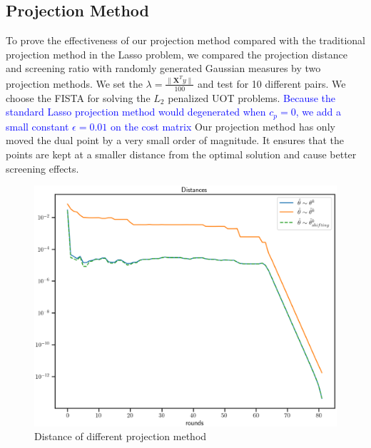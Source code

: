 \documentclass[twoside]{article}
\theoremstyle{plain}
\newcommand{\changeXS}[1]{\textcolor{blue}{#1}}
\begin{document}
\subsection{Projection Method}
To prove the effectiveness of our projection method compared with the traditional projection method in the Lasso problem, we compared the projection distance and screening ratio with randomly generated Gaussian measures by two projection methods. We set the $\lambda = \frac{\|\mathbf{X}^Ty\|}{100}$ and test for 10 different pairs. We choose the FISTA for solving the $L_2$ penalized UOT problems. \changeXS{Because the standard Lasso projection method would degenerated when $c_p=0$, we add a small constant $\epsilon=0.01$ on the cost matrix }Our projection method has only moved the dual point by a very small order of magnitude. It ensures that the points are kept at a smaller distance from the optimal solution and cause better screening effects.
	\begin{figure}[h]
	\begin{center}	
	\includegraphics[width = \linewidth]{pic/projdis}
	\caption{Distance of different projection method}
	\end{center}	
	\end{figure}
\end{document}
